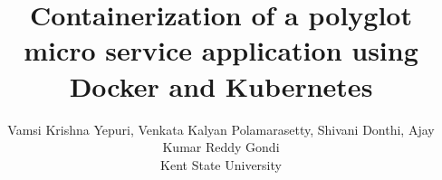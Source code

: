 \usepackage{filecontents}
\usepackage{cite}
\usepackage{amsmath,amssymb,amsfonts}
\usepackage{graphicx}
\usepackage{textcomp}
\usepackage{tabularx}
\usepackage{subcaption}
\usepackage{makecell}
\usepackage{url}
\usepackage[switch]{lineno}
\usepackage{listings}
\usepackage{multirow}

\captionsetup{compatibility=false}
\usepackage[margin=0.5in]{geometry}
\usepackage{textcomp}

\usepackage{listings}
\usepackage{tikz}
\def\checkmark{\tikz\fill[scale=0.4](0,.35) -- (.25,0) -- (1,.7) -- (.25,.15) -- cycle;} 





\title{ Containerization of a polyglot micro service application using
Docker and Kubernetes 
}

\author{Vamsi Krishna Yepuri,  Venkata Kalyan Polamarasetty, Shivani Donthi, Ajay Kumar Reddy Gondi \\
Kent State University}

